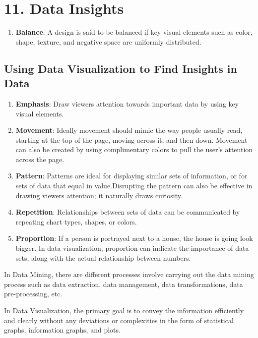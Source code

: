 \documentclass[]{book}
\providecommand{\tightlist}{%
  \setlength{\itemsep}{0pt}\setlength{\parskip}{0pt}}
\theoremstyle{definition}
\theoremstyle{definition}
\theoremstyle{definition}
\theoremstyle{remark}
\begin{document}
\section{11. Data Insights}\label{data-insights}

\begin{enumerate}
\def\labelenumi{\arabic{enumi}.}
\tightlist
\item
  \textbf{Balance}: A design is said to be balanced if key visual
  elements such as color, shape, texture, and negative space are
  uniformly distributed.
\end{enumerate}

\subsection{Using Data Visualization to Find Insights in
Data}\label{using-data-visualization-to-find-insights-in-data}

\begin{enumerate}
\def\labelenumi{\arabic{enumi}.}
\setcounter{enumi}{1}
\item
  \textbf{Emphasis}: Draw viewers attention towards important data by
  using key visual elements.
\item
  \textbf{Movement}: Ideally movement should mimic the way people
  usually read, starting at the top of the page, moving across it, and
  then down. Movement can also be created by using complimentary colors
  to pull the user's attention across the page.
\item
  \textbf{Pattern}: Patterns are ideal for displaying similar sets of
  information, or for sets of data that equal in value.Disrupting the
  pattern can also be effective in drawing viewers attention; it
  naturally draws curiosity.
\item
  \textbf{Repetition}: Relationships between sets of data can be
  communicated by repeating chart types, shapes, or colors.
\item
  \textbf{Proportion}: If a person is portrayed next to a house, the
  house is going look bigger. In data visualization, proportion can
  indicate the importance of data sets, along with the actual
  relationship between numbers.
\end{enumerate}

In Data Mining, there are different processes involve carrying out the
data mining process such as data extraction, data management, data
transformations, data pre-processing, etc.

In Data Visualization, the primary goal is to convey the information
efficiently and clearly without any deviations or complexities in the
form of statistical graphs, information graphs, and plots.
\end{document}
